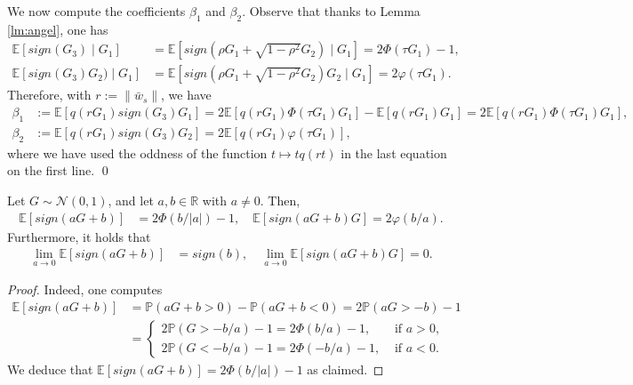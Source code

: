 We now compute the coefficients $\beta_1$ and $\beta_2$. Observe that thanks to Lemma \ref{lm:angel}, one has
\begin{align*}
\mathbb E[sign(G_3) \mid G_1]
&=  \mathbb E[sign(\rho G_1 + \sqrt{1-\rho^2}G_2)\mid G_1] = 2\Phi\left(\tau G_1\right)-1,\\
\mathbb E[sign(G_3)G_2) \mid G_1] &=  \mathbb E[sign(\rho G_1 + \sqrt{1-\rho^2}G_2)G_2 \mid G_1] = 2\varphi(\tau G_1).
\end{align*}
Therefore, with $r := \|\bar w_s\|$, we have
\begin{align*}
    \beta_1 &:= \mathbb E[q(rG_1) sign(G_3) G_1] = 2\mathbb E\left[q(rG_1)\Phi\left(\tau G_1\right)G_1\right] - \mathbb E\left[q(rG_1)G_1 \right]=2\mathbb E\left[q(rG_1)\Phi\left(\tau G_1\right)G_1\right],\\
    \beta_2 &:= \mathbb E[q(rG_1) sign(G_3) G_2] = 2\mathbb E\left[q(rG_1)\varphi(\tau G_1)\right],
\end{align*}
where we have used the oddness of the function $t \mapsto tq(rt)$ in the last equation on the first line. \qed

\begin{lemma}
\label{lm:angel}
    Let $G \sim \mathcal N(0,1)$, and let $a,b \in \mathbb R$ with $a \ne 0$. Then,
    \begin{align}
        \mathbb E[sign(aG+b)] &= 2\Phi(b/|a|)-1,\quad 
        \mathbb E[sign(aG+b)G] = 2\varphi(b/a).
    \end{align}
Furthermore, it holds that
\begin{align}
    \lim_{a \to 0} \mathbb E[sign(aG+b)] &= sign(b),\quad \lim_{a \to 0} \mathbb E[sign(aG+b)G] = 0. 
\end{align}
\end{lemma}
\begin{proof}
    Indeed, one computes
    \begin{align*}
    \mathbb E[sign(aG+b)] &= \mathbb P(aG+b>0)-\mathbb P(aG+b<0)=2\mathbb P(aG>-b)-1\\
    &= \begin{cases}
        2\mathbb P(G>-b/a) - 1 = 2\Phi(b/a)-1,&\mbox{ if }a>0,\\
        2\mathbb P(G<-b/a)-1=2\Phi(-b/a)-1,&\mbox{ if }a<0.
    \end{cases}
    \end{align*}
    We deduce that $\mathbb E[sign(aG+b)]=2\Phi(b/|a|)-1$ as claimed.
\end{proof}

